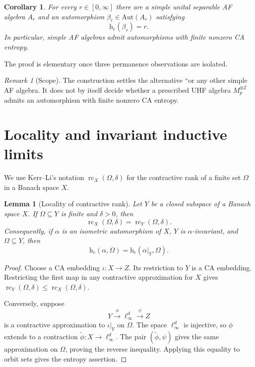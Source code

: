 \documentclass[11pt]{article}
\newtheorem{lemma}[theorem]{Lemma}
\newtheorem{corollary}[theorem]{Corollary}
\theoremstyle{remark}
\newtheorem{remark}[theorem]{Remark}
\newcommand{\hc}{\mathrm{h}_{\mathrm c}}
\newcommand{\Aut}{\mathrm{Aut}}
\newcommand{\Z}{\mathbb Z}
\begin{document}
\begin{corollary}\label{cor:all-values}
For every $r\in[0,\infty]$ there are a simple unital separable AF algebra
$A_r$ and an automorphism $\beta_r\in\Aut(A_r)$ satisfying
\[
   \hc(\beta_r)=r.
\]
In particular, simple AF algebras admit automorphisms with finite nonzero CA
entropy.
\end{corollary}

The proof is elementary once three permanence observations are isolated.

\begin{remark}[Scope]\label{rem:scope}
The construction settles the alternative ``or any other simple AF algebra.
It does not by itself decide whether a prescribed UHF algebra
$M_p^{\otimes\Z}$ admits an automorphism with finite nonzero CA entropy.
\end{remark}

\section{Locality and invariant inductive limits}

We use Kerr--Li's notation $\operatorname{rc}_X(\Omega,\delta)$ for the
contractive rank of a finite set $\Omega$ in a Banach space $X$.

\begin{lemma}[Locality of contractive rank]\label{lem:locality}
Let $Y$ be a closed subspace of a Banach space $X$.  If
$\Omega\subseteq Y$ is finite and $\delta>0$, then
\[
  \operatorname{rc}_X(\Omega,\delta)
  =\operatorname{rc}_Y(\Omega,\delta).
\]
Consequently, if $\alpha$ is an isometric automorphism of $X$, $Y$ is
$\alpha$-invariant, and $\Omega\subseteq Y$, then
\[
  \hc(\alpha,\Omega)=\hc(\alpha|_Y,\Omega).
\]
\end{lemma}

\begin{proof}
Choose a CA embedding $\iota\colon X\to Z$.  Its restriction to $Y$ is a CA
embedding.  Restricting the first map in any contractive approximation for
$X$ gives
$\operatorname{rc}_Y(\Omega,\delta)\leq
 \operatorname{rc}_X(\Omega,\delta)$.

Conversely, suppose
\[
  Y\xrightarrow{\phi}\ell_\infty^d
   \xrightarrow{\psi} Z
\]
is a contractive approximation to $\iota|_Y$ on $\Omega$.  The space
$\ell_\infty^d$ is injective, so $\phi$ extends to a contraction
$\widetilde\phi\colon X\to\ell_\infty^d$.  The pair
$(\widetilde\phi,\psi)$ gives the same approximation on $\Omega$, proving
the reverse inequality.  Applying this equality to orbit sets gives the
entropy assertion.
\end{proof}
\end{document}
